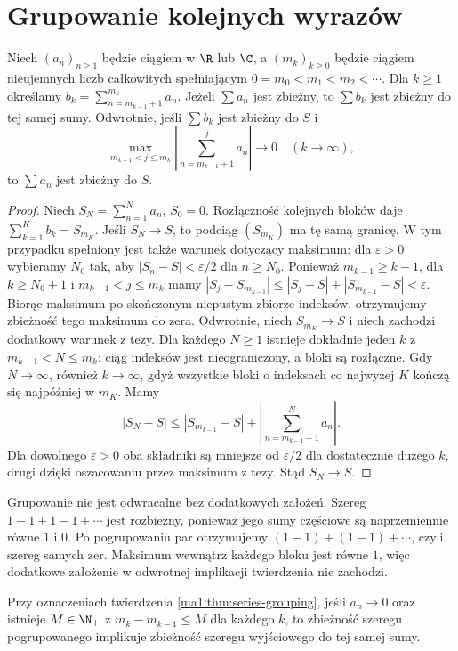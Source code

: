 \section{Grupowanie kolejnych wyrazów}
\begin{twierdzenie}
\label{ma1:thm:series-grouping}
Niech $(a_n)_{n\ge1}$ będzie ciągiem w $\R$ lub $\C$, a $(m_k)_{k\ge0}$ będzie ciągiem nieujemnych liczb całkowitych spełniającym $0=m_0<m_1<m_2<\cdots$. Dla $k\ge1$ określamy
$b_k=\sum_{n=m_{k-1}+1}^{m_k}a_n$.
Jeżeli $\sum a_n$ jest zbieżny, to $\sum b_k$ jest zbieżny do tej samej sumy.
Odwrotnie, jeśli $\sum b_k$ jest zbieżny do $S$ i
\[
 \max_{m_{k-1}<j\le m_k}
 \left|\sum_{n=m_{k-1}+1}^{j}a_n\right|
 \longrightarrow 0\quad(k\to\infty),
\]
to $\sum a_n$ jest zbieżny do $S$.
\end{twierdzenie}
\begin{proof}
Niech $S_N=\sum_{n=1}^N a_n$, $S_0=0$. Rozłączność kolejnych bloków daje $\sum_{k=1}^K b_k=S_{m_K}$. Jeśli $S_N\to S$, to podciąg $(S_{m_K})$ ma tę samą granicę. W tym przypadku spełniony jest także warunek dotyczący maksimum: dla $\varepsilon>0$ wybieramy $N_0$ tak, aby $|S_n-S|<\varepsilon/2$ dla $n\ge N_0$. Ponieważ $m_{k-1}\ge k-1$, dla $k\ge N_0+1$ i $m_{k-1}<j\le m_k$ mamy
$|S_j-S_{m_{k-1}}|\le |S_j-S|+|S_{m_{k-1}}-S|<\varepsilon$. Biorąc maksimum po skończonym niepustym zbiorze indeksów, otrzymujemy zbieżność tego maksimum do zera.
Odwrotnie, niech $S_{m_K}\to S$ i niech zachodzi dodatkowy warunek z tezy. Dla każdego $N\ge1$ istnieje dokładnie jeden $k$ z $m_{k-1}<N\le m_k$: ciąg indeksów jest nieograniczony, a bloki są rozłączne. Gdy $N\to\infty$, również $k\to\infty$, gdyż wszystkie bloki o indeksach co najwyżej $K$ kończą się najpóźniej w $m_K$. Mamy
\[
 |S_N-S|\le |S_{m_{k-1}}-S|+
 \left|\sum_{n=m_{k-1}+1}^N a_n\right|.
\]
Dla dowolnego $\varepsilon>0$ oba składniki są mniejsze od $\varepsilon/2$ dla dostatecznie dużego $k$, drugi dzięki oszacowaniu przez maksimum z tezy. Stąd $S_N\to S$.
\end{proof}
\begin{przyklad}
Grupowanie nie jest odwracalne bez dodatkowych założeń. Szereg $1-1+1-1+\cdots$ jest rozbieżny, ponieważ jego sumy częściowe są naprzemiennie równe $1$ i $0$. Po pogrupowaniu par otrzymujemy $(1-1)+(1-1)+\cdots$, czyli szereg samych zer. Maksimum wewnątrz każdego bloku jest równe $1$, więc dodatkowe założenie w odwrotnej implikacji twierdzenia nie zachodzi.
\end{przyklad}
\begin{wniosek}
\label{ma1:cor:bounded-grouping}
Przy oznaczeniach twierdzenia \ref{ma1:thm:series-grouping}, jeśli $a_n\to0$ oraz istnieje $M\in\N_+$ z $m_k-m_{k-1}\le M$ dla każdego $k$, to zbieżność szeregu pogrupowanego implikuje zbieżność szeregu wyjściowego do tej samej sumy.
\end{wniosek}
